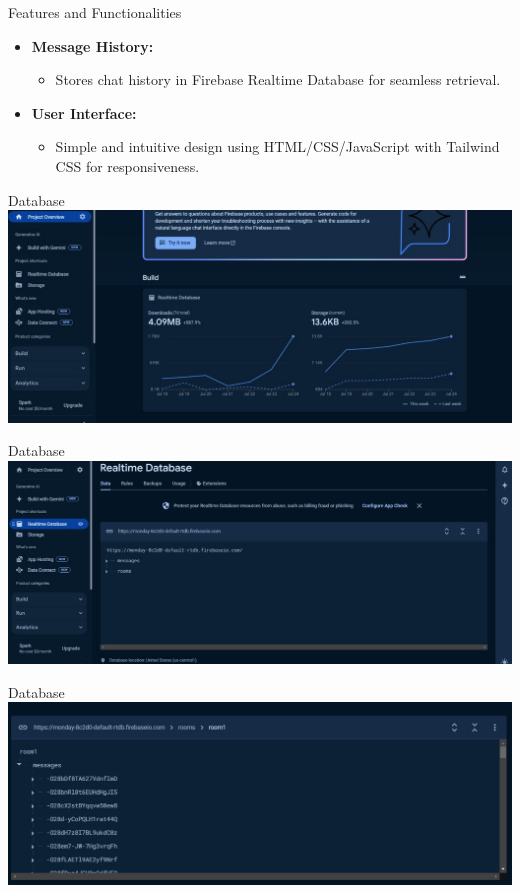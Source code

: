 \documentclass{beamer}
\begin{document}
\begin{frame}{Features and Functionalities}
    \begin{itemize}
        \item \textbf{Message History:}
        \begin{itemize}
            \item Stores chat history in Firebase Realtime Database for seamless retrieval.
        \end{itemize}
        \item \textbf{User Interface:}
        \begin{itemize}
            \item Simple and intuitive design using HTML/CSS/JavaScript with Tailwind CSS for responsiveness.
        \end{itemize}
    \end{itemize}
\end{frame}

\begin{frame}{Database}
        \centering
        \includegraphics[width=\textwidth]{1.jpg}
\end{frame}

\begin{frame}{Database}
    \centering
    \includegraphics[width=\textwidth]{2.jpg}
\end{frame}

\begin{frame}{Database}
    \centering
    \includegraphics[width=\textwidth]{3.jpg}
\end{frame}
\end{document}
